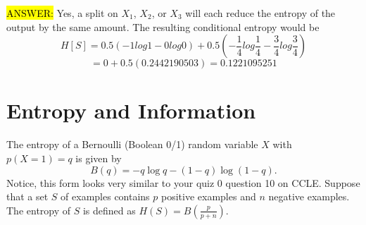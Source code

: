 \documentclass[11pt]{article}
\begin{document}
\begin{enumerate}
\hl{ANSWER:} Yes, a split on $X_1$, $X_2$, or $X_3$ will each reduce the entropy of the output by the same amount. The resulting conditional entropy would be
\begin{equation*} H[S] = 0.5(-1log1 - 0log0) + 0.5(-\frac{1}{4}log\frac{1}{4} -\frac{3}{4}log\frac{3}{4})
\end{equation*}
\begin{equation*} = 0 + 0.5(0.2442190503) = 0.1221095251
\end{equation*}
\end{enumerate}

\section{Entropy and Information }
The entropy of a Bernoulli (Boolean 0/1) random variable $X$ with $p(X = 1) = q$ is given by
\begin{equation*}
B(q) = - q \log q - (1 - q) \log(1 - q).
\end{equation*}
Notice, this form looks very similar to your quiz 0 question 10 on CCLE. Suppose that a set $S$ of examples contains $p$ positive examples and $n$ negative examples. The entropy of $S$ is defined as $H(S) = B\left(\frac{p}{p+n}\right)$.
\end{document}
